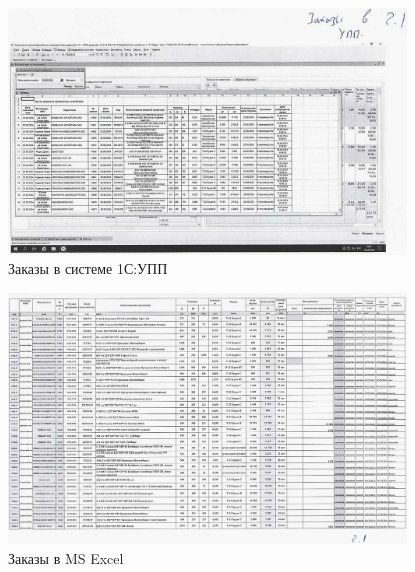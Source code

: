 
\begin{figure}
\begin{center}
  \includegraphics[height=0.94\textheight, width=0.94\textwidth, keepaspectratio]{Pics 1/2.1 Заказы в УПП_0001.jpg }
\end{center}
  \caption{Заказы в системе 1С:УПП}
  \label{pic:2.1 Заказы в УПП_0001}
\end{figure}

\begin{figure}
\begin{center}
  \includegraphics[height=0.94\textheight, width=0.94\textwidth, keepaspectratio]{Pics 1/2.1 Заказы в файле эксель АВА_0001.jpg}
\end{center}
  \caption{Заказы в MS Excel}
  \label{pic:2.1 Заказы в файле эксель АВА_0001}
\end{figure}

